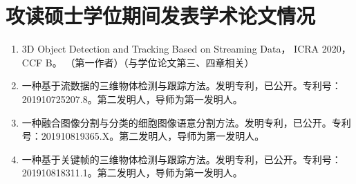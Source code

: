 
\ifprint
	\newpage
	\thispagestyle{empty}
	\mbox{}
	
	\clearpage
	\setcounter{page}{10}
\fi

\chapter*{攻读硕士学位期间发表学术论文情况}

\begin{enumerate}
	\item 3D Object Detection and Tracking Based on Streaming Data， ICRA 2020， CCF B。 （第一作者）（与学位论文第三、四章相关）%
	\item 一种基于流数据的三维物体检测与跟踪方法。发明专利，已公开。专利号：201910725207.8。第二发明人，导师为第一发明人。
	\item 一种融合图像分割与分类的细胞图像语意分割方法。发明专利，已公开。专利号：201910819365.X。第二发明人，导师为第一发明人。
	\item 一种基于关键帧的三维物体检测与跟踪方法。发明专利，已公开。专利号：201910818311.1。第二发明人，导师为第一发明人。
\end{enumerate}



\ifprint
	\newpage
	\thispagestyle{empty}
	\mbox{}
	
	\clearpage
	\setcounter{page}{10}
\fi